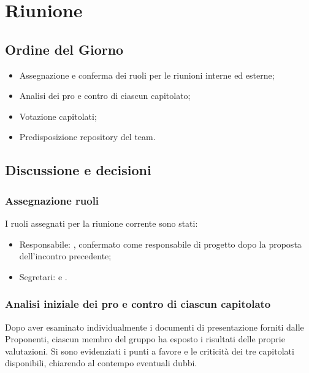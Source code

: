 \section{Riunione}
\subsection{Ordine del Giorno}
\begin{itemize}
	\item Assegnazione e conferma dei ruoli per le riunioni interne ed esterne;
	\item Analisi dei pro e contro di ciascun capitolato;
	\item Votazione capitolati;
	\item Predisposizione repository del team.
\end{itemize}

\subsection{Discussione e decisioni}

\subsubsection{Assegnazione ruoli}
I ruoli assegnati per la riunione corrente sono stati:
\begin{itemize}
	\item Responsabile: \sebastiano, confermato come responsabile di progetto dopo la proposta dell’incontro precedente;
	\item Segretari: \tommaso{} e \raul.
\end{itemize}

\subsubsection{Analisi iniziale dei pro e contro di ciascun capitolato}
Dopo aver esaminato individualmente i documenti di presentazione forniti dalle Proponenti, ciascun membro del gruppo ha esposto i risultati delle proprie valutazioni. Si sono evidenziati i punti a favore e le criticità dei tre capitolati disponibili, chiarendo al contempo eventuali dubbi.

